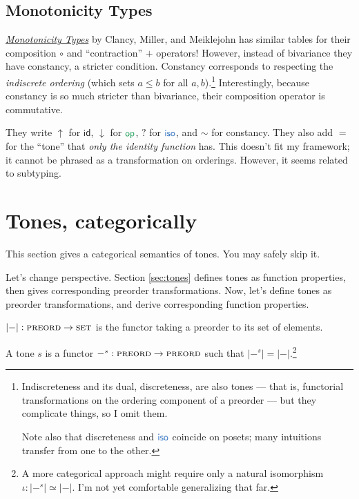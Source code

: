 \documentclass{rntz}
\newcommand{\ms}[1]{\ensuremath{\mathsf{#1}}}
\newcommand{\cat}[1]{\textsc{#1}} %
\newcommand{\Pre}{\cat{preord}}
\newcommand{\Set}{\cat{set}}
\newcommand{\isoto}{\simeq}
\newcommand{\id}{\ms{id}}
\newcommand{\op}{\ms{op}}
\newcommand{\iso}{\ms{iso}}     %
\newcommand{\tm}{\id}                        %
\newcommand{\ta}{{\color{ForestGreen}\op}}   %
\newcommand{\ti}{{\color{NavyBlue}\iso}}     %
\begin{document}
\subsection{Monotonicity Types}

\href{https://infoscience.epfl.ch/record/231867/files/monotonicity-types.pdf}{\emph{Monotonicity
    Types}} by Clancy, Miller, and Meiklejohn has similar tables for their
composition $\circ$ and ``contraction'' $+$ operators! However, instead of
bivariance they have constancy, a stricter condition.
%
Constancy corresponds to respecting the \emph{indiscrete ordering} (which sets
$a \le b$ for all $a,b$).\footnote{Indiscreteness and its dual, discreteness,
  are also tones --- that is, functorial transformations on the ordering
  component of a preorder --- but they complicate things, so I omit them.

  Note also that discreteness and $\ti$ coincide on posets; many intuitions
  transfer from one to the other.}
%
Interestingly, because constancy is so much stricter than bivariance, their
composition operator is commutative.

They write $\uparrow$ for $\tm$, $\downarrow$ for $\ta$, $?$ for $\ti$, and
$\sim$ for constancy. They also add $=$ for the ``tone'' that \emph{only the
  identity function} has. This doesn't fit my framework; it cannot be phrased as
a transformation on orderings. However, it seems related to subtyping.



\section{Tones, categorically}

\newcommand{\elemset}[1]{\ensuremath{|{#1}|}}
\newcommand{\elemsetfn}[0]{\elemset{-}}

This section gives a categorical semantics of tones. You may safely skip it.

Let's change perspective. Section \ref{sec:tones} defines tones as function
pro\-per\-ties, then gives corresponding pre\-order trans\-form\-ations. Now,
let's define tones as preorder transformations, and derive corresponding
function properties.

\begin{definition}
  $\elemsetfn : \Pre \to \Set$ is the functor taking a preorder to its set of
  elements.
\end{definition}

\begin{definition}[Tones]\label{def:tone}
  A tone $s$ is a functor $-^s : \Pre \to \Pre$ such that $\elemset{-^s} =
  \elemsetfn$.\footnote{A more categorical approach might require only a natural
    isomorphism \(\iota : \elemset{-^s} \isoto \elemsetfn\). I'm not yet
    comfortable generalizing that far. }
\end{definition}
\end{document}
